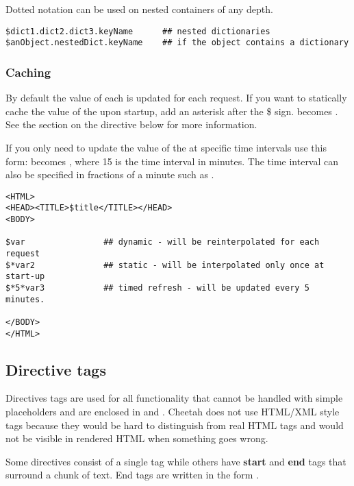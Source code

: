 Dotted notation can be used on nested containers of any depth.
\begin{verbatim}
$dict1.dict2.dict3.keyName      ## nested dictionaries
$anObject.nestedDict.keyName    ## if the object contains a dictionary
\end{verbatim}


\subsubsection{Caching}

By default the value of each  is updated for each request.
If you want to statically cache the value of the  upon
startup, add an asterisk after the \$ sign.   becomes .
See the section on the  directive below for more information.

If you only need to update the value of the  at specific time intervals use
this form:  becomes  , where 15 is the time interval in
minutes.  The time interval can also be specified in fractions of a minute such
as .

\begin{verbatim}
<HTML>
<HEAD><TITLE>$title</TITLE></HEAD>
<BODY>

$var                ## dynamic - will be reinterpolated for each request
$*var2              ## static - will be interpolated only once at start-up
$*5*var3            ## timed refresh - will be updated every 5 minutes.

</BODY>
</HTML>
\end{verbatim}


\subsection{Directive tags}
Directives tags are used for all functionality that cannot be handled with
simple placeholders and are enclosed in \code{\#} and \code{/\#}.
Cheetah does not use HTML/XML style tags because they would be hard to
distinguish from real HTML tags and would not be visible in rendered HTML when
something goes wrong.

Some directives consist of a single tag while others have {\bf start} and
{\bf end} tags that surround a chunk of text.  End tags are written in the form
.

